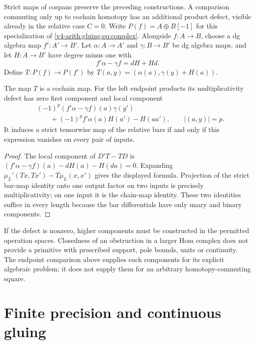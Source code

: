 Strict maps of cospans preserve the preceding constructions. A
comparison commuting only up to cochain homotopy has an additional
product defect, visible already in the relative case \(C=0\).
Write \(P(f)=A\oplus B[-1]\) for this specialization of
\eqref{v4-arith:gluing:eq:complex}. Alongside \(f:A\to B\),
choose a dg algebra map \(f':A'\to B'\).
Let \(\alpha:A\to A'\) and \(\gamma:B\to B'\) be dg algebra maps,
and let \(H:A\to B'\) have degree minus one with
\[
 f'\alpha-\gamma f=dH+Hd.
\]
Define
\(T:P(f)\to P(f')\) by
\(T(a,y)=(\alpha(a),\gamma(y)+H(a))\).

\begin{proposition}\label{v4-arith:gluing:prop:map-defect}
The map \(T\) is a cochain map. For the left endpoint products its
multiplicativity defect has zero first component and local component
\[
 \begin{split}
 &(-1)^p(f'\alpha-\gamma f)(a)\gamma(y')\\
 &\qquad+(-1)^pf'\alpha(a)H(a')-H(aa'),\qquad |(a,y)|=p.
 \end{split}
\]
It induces a strict tensorwise map of the relative bars if and only
if this expression vanishes on every pair of inputs.
\end{proposition}

\begin{proof}
The local component of \(D'T-TD\) is
\((f'\alpha-\gamma f)(a)-dH(a)-H(da)=0\).
Expanding \(\mu_L'(Tx,Tx')-T\mu_L(x,x')\) gives the displayed
formula. Projection of the strict bar-map identity onto one output
factor on two inputs is precisely multiplicativity; on one input it
is the chain-map identity. These two identities suffice in every
length because the bar differentials have only unary and binary
components.
\end{proof}

If the defect is nonzero, higher components must be constructed in
the permitted operation spaces. Closedness of an obstruction in a
larger Hom complex does not provide a primitive with prescribed
support, pole bounds, units or continuity. The endpoint comparison
above supplies such components for its explicit algebraic problem;
it does not supply them for an arbitrary homotopy-commuting square.

\section{Finite precision and continuous gluing}
\label{v4-arith:gluing:sec:completion}

